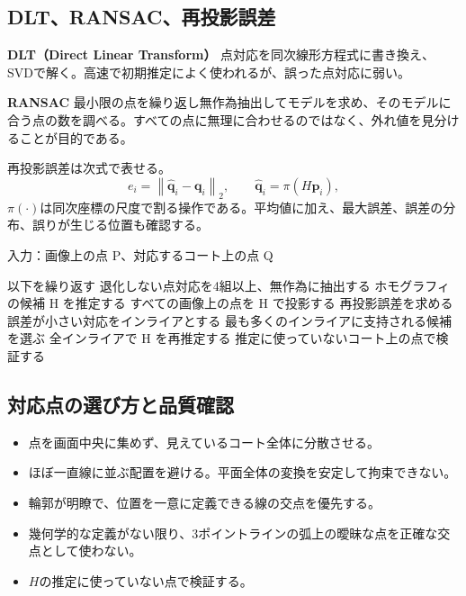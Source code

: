 \documentclass[11pt,a4paper,oneside]{report}
\begin{document}
\subsection{DLT、RANSAC、再投影誤差}

\begin{historyBox}
\textbf{DLT（Direct Linear Transform）}\quad
点対応を同次線形方程式に書き換え、SVDで解く。高速で初期推定によく使われるが、誤った点対応に弱い。

\textbf{RANSAC}\quad
最小限の点を繰り返し無作為抽出してモデルを求め、そのモデルに合う点の数を調べる。すべての点に無理に合わせるのではなく、外れ値を見分けることが目的である。
\end{historyBox}

再投影誤差は次式で表せる。
\[
e_i=\left\|\widehat{\mathbf q}_i-\mathbf q_i\right\|_2,
\qquad
\widehat{\mathbf q}_i=\pi(H\mathbf p_i),
\]
$\pi(\cdot)$は同次座標の尺度で割る操作である。平均値に加え、最大誤差、誤差の分布、誤りが生じる位置も確認する。

\begin{pseudoBox}
入力：画像上の点 P、対応するコート上の点 Q

以下を繰り返す
  退化しない点対応を4組以上、無作為に抽出する
  ホモグラフィの候補 H を推定する
  すべての画像上の点を H で投影する
  再投影誤差を求める
  誤差が小さい対応をインライアとする
最も多くのインライアに支持される候補を選ぶ
全インライアで H を再推定する
推定に使っていないコート上の点で検証する
\end{pseudoBox}

\subsection{対応点の選び方と品質確認}

\begin{itemize}
  \item 点を画面中央に集めず、見えているコート全体に分散させる。
  \item ほぼ一直線に並ぶ配置を避ける。平面全体の変換を安定して拘束できない。
  \item 輪郭が明瞭で、位置を一意に定義できる線の交点を優先する。
  \item 幾何学的な定義がない限り、3ポイントラインの弧上の曖昧な点を正確な交点として使わない。
  \item $H$の推定に使っていない点で検証する。
\end{itemize}
\end{document}
